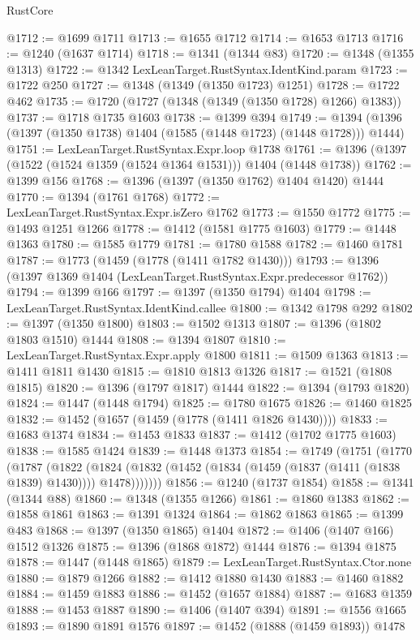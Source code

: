 \begin{lexlean}{RustCore}
\begin{coremodule}
{\begin{coremodule}
{{{{{{{{{{{{{{{{{{{{{{{{{{{{{{{{{{{{{{{{{{{{{@1712 := @1699 @1711
@1713 := @1655 @1712
@1714 := @1653 @1713
@1716 := @1240 (@1637 @1714)
@1718 := @1341 (@1344 @83)
@1720 := @1348 (@1355 @1313)
@1722 := @1342 LexLeanTarget.RustSyntax.IdentKind.param
@1723 := @1722 @250
@1727 := @1348 (@1349 (@1350 @1723) @1251)
@1728 := @1722 @462
@1735 := @1720 (@1727 (@1348 (@1349 (@1350 @1728) @1266) @1383))
@1737 := @1718 @1735 @1603
@1738 := @1399 @394
@1749 := @1394 (@1396 (@1397 (@1350 @1738) @1404 (@1585 (@1448 @1723) (@1448 @1728))) @1444)
@1751 := LexLeanTarget.RustSyntax.Expr.loop @1738
@1761 := @1396 (@1397 (@1522 (@1524 @1359 (@1524 @1364 @1531))) @1404 (@1448 @1738))
@1762 := @1399 @156
@1768 := @1396 (@1397 (@1350 @1762) @1404 @1420) @1444
@1770 := @1394 (@1761 @1768)
@1772 := LexLeanTarget.RustSyntax.Expr.isZero @1762
@1773 := @1550 @1772
@1775 := @1493 @1251 @1266
@1778 := @1412 (@1581 @1775 @1603)
@1779 := @1448 @1363
@1780 := @1585 @1779
@1781 := @1780 @1588
@1782 := @1460 @1781
@1787 := @1773 (@1459 (@1778 (@1411 @1782 @1430)))
@1793 := @1396 (@1397 @1369 @1404 (LexLeanTarget.RustSyntax.Expr.predecessor @1762))
@1794 := @1399 @166
@1797 := @1397 (@1350 @1794) @1404
@1798 := LexLeanTarget.RustSyntax.IdentKind.callee
@1800 := @1342 @1798 @292
@1802 := @1397 (@1350 @1800)
@1803 := @1502 @1313
@1807 := @1396 (@1802 @1803 @1510) @1444
@1808 := @1394 @1807
@1810 := LexLeanTarget.RustSyntax.Expr.apply @1800
@1811 := @1509 @1363
@1813 := @1411 @1811 @1430
@1815 := @1810 @1813 @1326
@1817 := @1521 (@1808 @1815)
@1820 := @1396 (@1797 @1817) @1444
@1822 := @1394 (@1793 @1820)
@1824 := @1447 (@1448 @1794)
@1825 := @1780 @1675
@1826 := @1460 @1825
@1832 := @1452 (@1657 (@1459 (@1778 (@1411 @1826 @1430))))
@1833 := @1683 @1374
@1834 := @1453 @1833
@1837 := @1412 (@1702 @1775 @1603)
@1838 := @1585 @1424
@1839 := @1448 @1373
@1854 := @1749
    (@1751
      (@1770
        (@1787
          (@1822
            (@1824 (@1832 (@1452 (@1834 (@1459 (@1837 (@1411 (@1838 @1839) @1430)))) @1478)))))))
@1856 := @1240 (@1737 @1854)
@1858 := @1341 (@1344 @88)
@1860 := @1348 (@1355 @1266)
@1861 := @1860 @1383
@1862 := @1858 @1861
@1863 := @1391 @1324
@1864 := @1862 @1863
@1865 := @1399 @483
@1868 := @1397 (@1350 @1865) @1404
@1872 := @1406 (@1407 @166) @1512 @1326
@1875 := @1396 (@1868 @1872) @1444
@1876 := @1394 @1875
@1878 := @1447 (@1448 @1865)
@1879 := LexLeanTarget.RustSyntax.Ctor.none
@1880 := @1879 @1266
@1882 := @1412 @1880 @1430
@1883 := @1460 @1882
@1884 := @1459 @1883
@1886 := @1452 (@1657 @1884)
@1887 := @1683 @1359
@1888 := @1453 @1887
@1890 := @1406 (@1407 @394)
@1891 := @1556 @1665
@1893 := @1890 @1891 @1576
@1897 := @1452 (@1888 (@1459 @1893)) @1478
}}}}}}}}}}}}}}}}}}}}}}}}}}}}}}}}}}}}}}}}}}}}}
\end{coremodule}}
\end{coremodule}
\end{lexlean}
